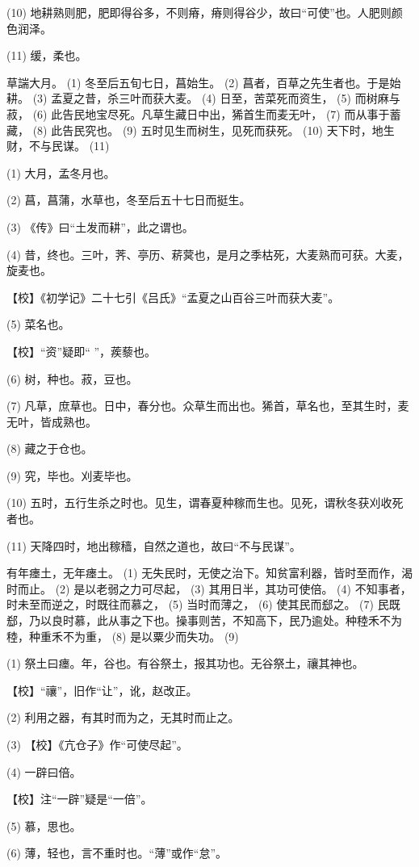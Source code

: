 \documentclass[12pt,UTF8]{ctexbook}
\begin{document}
(10) 地耕熟则肥，肥即得谷多，不则瘠，瘠则得谷少，故曰“可使”也。人肥则颜色润泽。

(11) 缓，柔也。

草諯大月。 (1) 冬至后五旬七日，菖始生。 (2) 菖者，百草之先生者也。于是始耕。 (3) 孟夏之昔，杀三叶而获大麦。 (4) 日至，苦菜死而资生， (5) 而树麻与菽， (6) 此告民地宝尽死。凡草生藏日中出，狶首生而麦无叶， (7) 而从事于蓄藏， (8) 此告民究也。 (9) 五时见生而树生，见死而获死。 (10) 天下时，地生财，不与民谋。 (11)

(1) 大月，孟冬月也。

(2) 菖，菖蒲，水草也，冬至后五十七日而挺生。

(3) 《传》曰“土发而耕”，此之谓也。

(4) 昔，终也。三叶，荠、亭历、菥蓂也，是月之季枯死，大麦熟而可获。大麦，旋麦也。

【校】《初学记》二十七引《吕氏》“孟夏之山百谷三叶而获大麦”。

(5) 菜名也。

【校】“资”疑即“ ”，蒺藜也。

(6) 树，种也。菽，豆也。

(7) 凡草，庶草也。日中，春分也。众草生而出也。狶首，草名也，至其生时，麦无叶，皆成熟也。

(8) 藏之于仓也。

(9) 究，毕也。刈麦毕也。

(10) 五时，五行生杀之时也。见生，谓春夏种稼而生也。见死，谓秋冬获刈收死者也。

(11) 天降四时，地出稼穑，自然之道也，故曰“不与民谋”。

有年瘗土，无年瘗土。 (1) 无失民时，无使之治下。知贫富利器，皆时至而作，渴时而止。 (2) 是以老弱之力可尽起， (3) 其用日半，其功可使倍。 (4) 不知事者，时未至而逆之，时既往而慕之， (5) 当时而薄之， (6) 使其民而郄之。 (7) 民既郄，乃以良时慕，此从事之下也。操事则苦，不知高下，民乃逾处。种稑禾不为稑，种重禾不为重， (8) 是以粟少而失功。 (9)

(1) 祭土曰瘗。年，谷也。有谷祭土，报其功也。无谷祭土，禳其神也。

【校】“禳”，旧作“让”，讹，赵改正。

(2) 利用之器，有其时而为之，无其时而止之。

(3) 【校】《亢仓子》作“可使尽起”。

(4) 一辟曰倍。

【校】注“一辟”疑是“一倍”。

(5) 慕，思也。

(6) 薄，轻也，言不重时也。“薄”或作“怠”。
\end{document}
